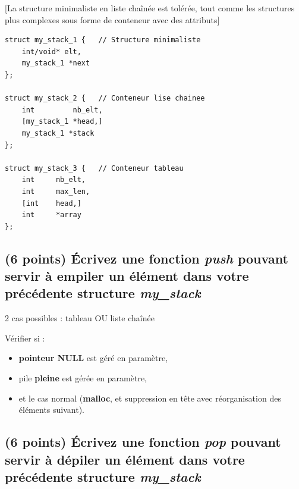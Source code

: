 \documentclass[11pt,a4paper]{article}
\begin{document}
\bigskip

\begin{center}
[La structure minimaliste en liste chaînée est tolérée, tout comme les structures plus complexes sous forme de conteneur avec des attributs]
\end{center}

\lstset{language=c}
\begin{lstlisting}[frame=single]
struct my_stack_1 {   // Structure minimaliste
	int/void* elt,
	my_stack_1 *next
};

struct my_stack_2 {   // Conteneur lise chainee
	int			nb_elt,
	[my_stack_1 *head,]
	my_stack_1 *stack
};

struct my_stack_3 {   // Conteneur tableau
	int		nb_elt,
	int		max_len,
	[int	head,]
	int		*array
};
\end{lstlisting}

\bigskip


\newpage

\subsection{(6 points) \'Ecrivez une fonction \og \textit{push} \fg{} pouvant servir à empiler un élément dans votre précédente structure \og \textit{my\_stack} \fg{} }

\bigskip

\begin{center}


\vspace{2cm}

2 cas possibles : tableau OU liste chaînée

\bigskip

Vérifier si :
\begin{itemize}
\item \textbf{pointeur NULL} est géré en paramètre,
\item pile \textbf{pleine} est gérée en paramètre,
\item et le cas normal (\textbf{malloc}, et suppression en tête avec réorganisation des éléments suivant).
\end{itemize}
\end{center}


\newpage

\subsection{(6 points) \'Ecrivez une fonction \og \textit{pop} \fg{} pouvant servir à dépiler un élément dans votre précédente structure \og \textit{my\_stack} \fg{} }
\end{document}
